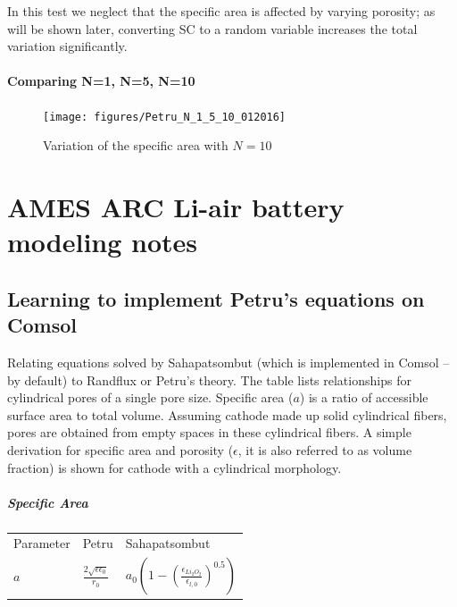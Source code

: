 \documentclass[12pt]{book}
\begin{document}
In this test we neglect that the specific area is affected by varying
porosity; as will be shown later, converting SC to a random variable
increases the total variation significantly. 

\subsubsection{Comparing N=1, N=5, N=10}
\begin{figure}[htb]
	\centering
	\texttt{[image: figures/Petru\_N\_1\_5\_10\_012016]}
	\caption{Variation of the specific area with $N = 10$}
\end{figure}

\chapter{AMES ARC Li-air battery modeling notes}
\section{Learning to implement Petru's equations on Comsol} Relating equations solved by Sahapatsombut (which is implemented in Comsol --by default) to Randflux or Petru's theory. The table lists relationships for cylindrical pores of a single pore size.
Specific area ($a$) is a ratio of accessible surface area to total volume. Assuming cathode made up solid cylindrical fibers,  pores are obtained from empty spaces in these cylindrical fibers. A simple derivation for specific area and porosity ($\epsilon$, it is also referred to as volume fraction) is shown for cathode with a cylindrical morphology.  
\paragraph{Specific Area}
\begin{center}
	\begin{tabular}{|l l l|}
		\hline		
           Parameter &  Petru & Sahapatsombut \\
		$a$  & $\frac{2\sqrt{\epsilon\epsilon_0}}{r_0}$ & $a_0\left(1-\left(\frac{\epsilon_{Li_2O_2}}{\epsilon_{l,0}}\right)^{0.5}\right)$ 	\\					
		\hline
	\end{tabular}
\end{center}
\end{document}
